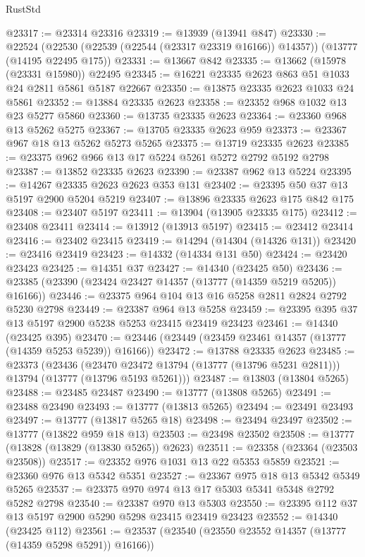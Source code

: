 \begin{lexlean}{RustStd}
\begin{coremodule}
@23317 := @23314 @23316
@23319 := @13939 (@13941 @847)
@23330 := @22524
    (@22530 (@22539 (@22544 (@23317 @23319 @16166)) @14357))
    (@13777 (@14195 @22495 @175))
@23331 := @13667 @842
@23335 := @13662 (@15978 (@23331 @15980)) @22495
@23345 := @16221 @23335 @2623 @863 @51 @1033 @24 @2811 @5861 @5187 @22667
@23350 := @13875 @23335 @2623 @1033 @24 @5861
@23352 := @13884 @23335 @2623
@23358 := @23352 @968 @1032 @13 @23 @5277 @5860
@23360 := @13735 @23335 @2623
@23364 := @23360 @968 @13 @5262 @5275
@23367 := @13705 @23335 @2623 @959
@23373 := @23367 @967 @18 @13 @5262 @5273 @5265
@23375 := @13719 @23335 @2623
@23385 := @23375 @962 @966 @13 @17 @5224 @5261 @5272 @2792 @5192 @2798
@23387 := @13852 @23335 @2623
@23390 := @23387 @962 @13 @5224
@23395 := @14267 @23335 @2623 @2623 @353 @131
@23402 := @23395 @50 @37 @13 @5197 @2900 @5204 @5219
@23407 := @13896 @23335 @2623 @175 @842 @175
@23408 := @23407 @5197
@23411 := @13904 (@13905 @23335 @175)
@23412 := @23408 @23411
@23414 := @13912 (@13913 @5197)
@23415 := @23412 @23414
@23416 := @23402 @23415
@23419 := @14294 (@14304 (@14326 @131))
@23420 := @23416 @23419
@23423 := @14332 (@14334 @131 @50)
@23424 := @23420 @23423
@23425 := @14351 @37
@23427 := @14340 (@23425 @50)
@23436 := @23385 (@23390 (@23424 @23427 @14357 (@13777 (@14359 @5219 @5205)) @16166))
@23446 := @23375 @964 @104 @13 @16 @5258 @2811 @2824 @2792 @5230 @2798
@23449 := @23387 @964 @13 @5258
@23459 := @23395 @395 @37 @13 @5197 @2900 @5238 @5253 @23415 @23419 @23423
@23461 := @14340 (@23425 @395)
@23470 := @23446 (@23449 (@23459 @23461 @14357 (@13777 (@14359 @5253 @5239)) @16166))
@23472 := @13788 @23335 @2623
@23485 := @23373
    (@23436
      (@23470 @23472 @13794 (@13777 (@13796 @5231 @2811)))
      @13794
      (@13777 (@13796 @5193 @5261)))
@23487 := @13803 (@13804 @5265)
@23488 := @23485 @23487
@23490 := @13777 (@13808 @5265)
@23491 := @23488 @23490
@23493 := @13777 (@13813 @5265)
@23494 := @23491 @23493
@23497 := @13777 (@13817 @5265 @18)
@23498 := @23494 @23497
@23502 := @13777 (@13822 @959 @18 @13)
@23503 := @23498 @23502
@23508 := @13777 (@13828 (@13829 (@13830 @5265)) @2623)
@23511 := @23358 (@23364 (@23503 @23508))
@23517 := @23352 @976 @1031 @13 @22 @5353 @5859
@23521 := @23360 @976 @13 @5342 @5351
@23527 := @23367 @975 @18 @13 @5342 @5349 @5265
@23537 := @23375 @970 @974 @13 @17 @5303 @5341 @5348 @2792 @5282 @2798
@23540 := @23387 @970 @13 @5303
@23550 := @23395 @112 @37 @13 @5197 @2900 @5290 @5298 @23415 @23419 @23423
@23552 := @14340 (@23425 @112)
@23561 := @23537 (@23540 (@23550 @23552 @14357 (@13777 (@14359 @5298 @5291)) @16166))

\end{coremodule}
\end{lexlean}
